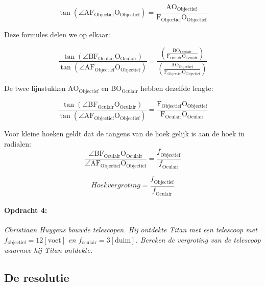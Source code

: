 \begin{equation}
\tan(\angle\mathrm{A}\mathrm{F_{Objectief}O_{Objectief}})
=\frac{\mathrm{A}\mathrm{O_{Objectief}}}{\mathrm{F_{Objectief}O_{Objectief}}}
\end{equation}


Deze formules delen we op elkaar:

\begin{equation}
\frac{\tan(\angle\mathrm{B}\mathrm{F_{Oculair}O_{Oculair}})}{\tan(\angle\mathrm{A}\mathrm{F_{Objectief}O_{Objectief}})}
=\frac{\left(\frac{\mathrm{B}\mathrm{O_{Oculair}}}{\mathrm{F_{Oculair}O_{Oculair}}}\right)}{\left(\frac{\mathrm{A}\mathrm{O_{Objectief}}}{\mathrm{F_{Objectief}O_{Objectief}}}\right)}
\end{equation}


De twee lijnstukken $\mathrm{A}\mathrm{O_{Objectief}}$ en $\mathrm{B}\mathrm{O_{Oculair}}$
hebben dezelfde lengte:

\begin{equation}
\frac{\tan(\angle\mathrm{B}\mathrm{F_{Oculair}O_{Oculair}})}{\tan(\angle\mathrm{A}\mathrm{F_{Objectief}O_{Objectief}})}
=\frac{\mathrm{F_{Objectief}O_{Objectief}}}{\mathrm{F_{Oculair}O_{Oculair}}}
\end{equation}


Voor kleine hoeken geldt dat de tangens van de hoek gelijk is aan
de hoek in radialen:
\begin{equation}
\frac{\angle\mathrm{B}\mathrm{F_{Oculair}O_{Oculair}}}{\angle\mathrm{A}\mathrm{F_{Objectief}O_{Objectief}}}
=\frac{\mathrm{\mathit{f}_{Objectief}}}{\mathrm{\mathit{f}_{Oculair}}}
\end{equation}


\begin{equation}
Hoekvergroting=\frac{\mathrm{\mathit{f}_{Objectief}}}{\mathrm{\mathit{f}_{Oculair}}}
\end{equation}



\paragraph*{Opdracht 4:}

\emph{Christiaan Huygens bouwde telescopen. Hij ontdekte Titan met een
telescoop met $f_{\mathrm{objectief}}=12[\mathrm{voet}]$ en
$f_{\mathrm{oculair}}=3[\mathrm{duim}]$. Bereken de vergroting van de
telescoop waarmee hij Titan ontdekte.}


\subsection{De resolutie}

